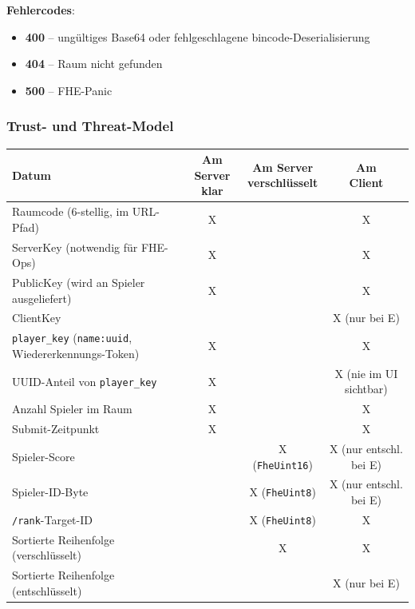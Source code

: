 \textbf{Fehlercodes}:
\begin{itemize}
    \item \textbf{400} -- ungültiges Base64 oder fehlgeschlagene bincode-Deserialisierung
    \item \textbf{404} -- Raum nicht gefunden
    \item \textbf{500} -- FHE-Panic
\end{itemize}

\subsubsection{Trust- und Threat-Model}

\begin{table}[H]
\centering
\small
\begin{tabular}{||p{6.5cm}|c|c|c||}
    \hline
    \textbf{Datum} & \makecell{\textbf{Am Server}\\\textbf{klar}} & \makecell{\textbf{Am Server}\\\textbf{verschlüsselt}} & \makecell{\textbf{Am}\\\textbf{Client}} \\
    \hline\hline
    Raumcode (6-stellig, im URL-Pfad) & X & & X \\
    \hline
    ServerKey (notwendig für FHE-Ops) & X & & X \\
    \hline
    PublicKey (wird an Spieler ausgeliefert) & X & & X \\
    \hline
    ClientKey & & & X (nur bei E) \\
    \hline
    \texttt{player\_key} (\texttt{name:uuid}, Wiedererkennungs-Token) & X & & X \\
    \hline
    UUID-Anteil von \texttt{player\_key} & X & & X (nie im UI sichtbar) \\
    \hline
    Anzahl Spieler im Raum & X & & X \\
    \hline
    Submit-Zeitpunkt & X & & X \\
    \hline
    Spieler-Score & & X (\texttt{FheUint16}) & X (nur entschl. bei E) \\
    \hline
    Spieler-ID-Byte & & X (\texttt{FheUint8}) & X (nur entschl. bei E) \\
    \hline
    \texttt{/rank}-Target-ID & & X (\texttt{FheUint8}) & X \\
    \hline
    Sortierte Reihenfolge (verschlüsselt) & & X & X \\
    \hline
    Sortierte Reihenfolge (entschlüsselt) & & & X (nur bei E) \\
    \hline
\end{tabular}
\end{table}

